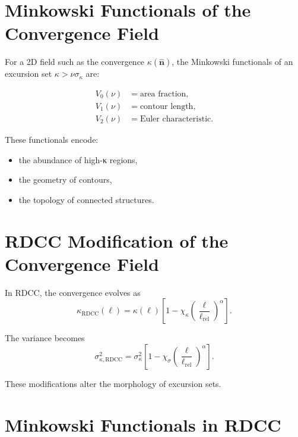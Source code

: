 \documentclass[11pt,a4paper]{article}
\begin{document}
\section{Minkowski Functionals of the Convergence Field}

For a 2D field such as the convergence $\kappa(\hat{\mathbf{n}})$, the Minkowski 
functionals of an excursion set $\kappa > \nu\sigma_{\kappa}$ are:

\begin{align}
    V_{0}(\nu) &= \text{area fraction}, \\
    V_{1}(\nu) &= \text{contour length}, \\
    V_{2}(\nu) &= \text{Euler characteristic}.
\end{align}

These functionals encode:

\begin{itemize}
    \item the abundance of high-κ regions,
    \item the geometry of contours,
    \item the topology of connected structures.
\end{itemize}
\section{RDCC Modification of the Convergence Field}

In RDCC, the convergence evolves as
\begin{equation}
    \kappa_{\mathrm{RDCC}}(\ell)
    = \kappa(\ell)
      \left[
        1 - \chi_{\kappa}
        \left(\frac{\ell}{\ell_{\mathrm{rel}}}\right)^{\alpha}
      \right].
\end{equation}

The variance becomes
\begin{equation}
    \sigma_{\kappa,\mathrm{RDCC}}^{2}
    = \sigma_{\kappa}^{2}
      \left[
        1 - \chi_{\sigma}
        \left(\frac{\ell}{\ell_{\mathrm{rel}}}\right)^{\alpha}
      \right].
\end{equation}

These modifications alter the morphology of excursion sets.
\section{Minkowski Functionals in RDCC}
\end{document}
